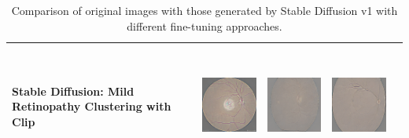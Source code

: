 \begin{table}[H]
\begin{tabularx}{\linewidth}{@{}>{\centering\arraybackslash}m{3cm}>{\centering\arraybackslash}X>{\centering\arraybackslash}X>{\centering\arraybackslash}X>{\centering\arraybackslash}X@{}}
\midrule
Stable Diffusion: Mild Retinopathy Clustering with Clip & 
\includegraphics[valign=M,width=\linewidth,height=4cm,keepaspectratio]{main/content/images/retinopatia_dreambooth_comparison/cluster_clip/cluster_3_image6.png} & 
\includegraphics[valign=M,width=\linewidth,height=4cm,keepaspectratio]{main/content/images/retinopatia_dreambooth_comparison/cluster_clip/cluster_8_image5.png} & 
\includegraphics[valign=M,width=\linewidth,height=4cm,keepaspectratio]{main/content/images/retinopatia_dreambooth_comparison/cluster_clip/cluster_2_image13.png} \\
\bottomrule
\end{tabularx}
\caption{Comparison of original images with those generated by Stable Diffusion v1 with different fine-tuning approaches.}
\label{tab:retinopatia_image_comparison_dreambooth_combined}
\end{table}